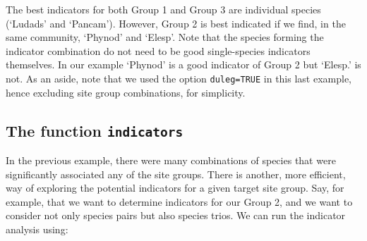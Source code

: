 \documentclass[11pt,a4paper]{article}
\begin{document}
The best indicators for both Group 1 and Group 3 are individual species (`Ludads' and `Pancam'). However, Group 2 is best indicated if we find, in the same community, `Phynod' and `Elesp'. Note that the species forming the indicator combination do not need to be good single-species indicators themselves. In our example `Phynod' is a good indicator of Group 2 but `Elesp.' is not. As an aside, note that we used the option \texttt{duleg=TRUE} in this last example, hence excluding site group combinations, for simplicity.

\subsection{The function \texttt{indicators}}
In the previous example, there were many combinations of species that were significantly associated any of the site groups. There is another, more efficient, way of exploring the potential indicators for a given target site group. Say, for example, that we want to determine indicators for our Group 2, and we want to consider not only species pairs but also species trios. We can run the indicator analysis using:
\end{document}

